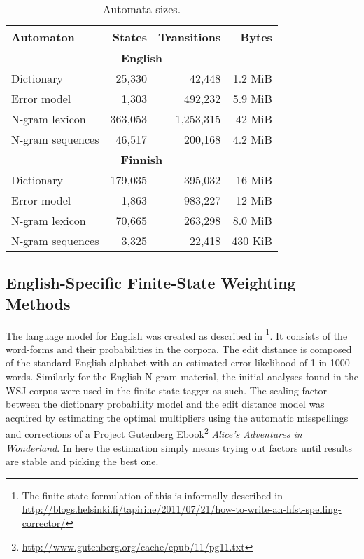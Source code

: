 \documentclass{llncs}
\begin{document}
\begin{table}
\caption{Automata sizes\label{table:sizes}.}
\begin{center}
\begin{tabular}{lrrr}
    Automaton & States & Transitions & Bytes \\
    \hline
    \multicolumn{4}{c}{\textbf{English}} \\
    \hline
    Dictionary & 25,330 & 42,448 & 1.2 MiB \\
    Error model & 1,303 & 492,232 & 5.9 MiB \\
    N-gram lexicon & 363,053 & 1,253,315 & 42 MiB \\
    N-gram sequences & 46,517 & 200,168 & 4.2 MiB \\
    \hline
    \multicolumn{4}{c}{\textbf{Finnish}} \\
    \hline
    Dictionary & 179,035 & 395,032 & 16 MiB \\
    Error model & 1,863 & 983,227 & 12 MiB \\
    N-gram lexicon & 70,665 & 263,298 & 8.0 MiB \\
    N-gram sequences & 3,325 & 22,418 & 430 KiB \\
    \hline
\end{tabular}
\end{center}
\end{table}

\subsection{English-Specific Finite-State Weighting Methods}

The language model for English was created as described in
\cite{norvig/2010}\footnote{The finite-state formulation of this is informally
described in
\url{http://blogs.helsinki.fi/tapirine/2011/07/21/how-to-write-an-hfst-spelling-corrector/}}.
It consists of the word-forms and their  probabilities in the corpora. The edit
distance is composed of the standard English alphabet with an estimated error
likelihood of 1 in 1000 words.  Similarly for the English N-gram material, the
initial analyses found in the WSJ corpus were used in the finite-state tagger
as such. The scaling factor between the dictionary probability model and the
edit distance model was acquired by estimating the optimal multipliers using
the automatic misspellings and corrections of a Project Gutenberg
Ebook\footnote{\url{http://www.gutenberg.org/cache/epub/11/pg11.txt}}
\emph{Alice's Adventures in Wonderland}. In here the estimation simply means
trying out factors until results are stable and picking the best one.
\end{document}
